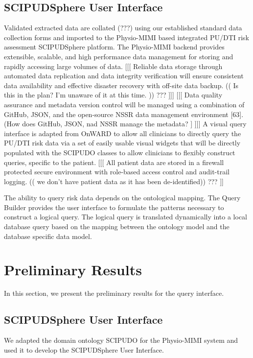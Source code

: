 \documentclass{amia}
\begin{document}
\subsection{SCIPUDSphere User Interface}
Validated extracted data are collated (???) using our established standard data collection forms and imported to the Physio-MIMI based integrated PU/DTI risk assessment SCIPUDSphere platform. The Physio-MIMI backend provides extensible, scalable, and high performance data management for storing and rapidly accessing large volumes of data. [[[ Reliable data storage through automated data replication and data integrity verification will ensure consistent data availability and effective disaster recovery with off-site data backup. (( Is this in the plan?  I'm unaware of it at this time. )) ??? ]]] [[[ Data quality assurance and metadata version control will be managed using a combination of GitHub, JSON, and the open-source NSSR data management environment [63]. (How does GitHub, JSON, nad NSSR manage the metadata? ] ]]] A visual query interface is adapted from OnWARD to allow all clinicians to directly query the PU/DTI risk data via a set of easily usable visual widgets that will be directly populated with the SCIPUDO classes to allow clinicians to flexibly construct queries, specific to the patient. [[[ All patient data are stored in a firewall protected secure environment with role-based access control and audit-trail logging. (( we don't have patient data as it has been de-identified)) ??? ]]

The ability to query risk data depends on the ontological mapping. The Query Builder provides the user interface to formulate the patterns necessary to construct a logical query. The logical query is translated dynamically into a local database query based on the mapping between the ontology model and the database specific data model.

\section{Preliminary Results}
In this section, we present the preliminary results for the query interface. 

\subsection{SCIPUDSphere User Interface}
We adapted the domain ontology SCIPUDO for the Physio-MIMI system and used it to develop the SCIPUDSphere User Interface. 
\end{document}

